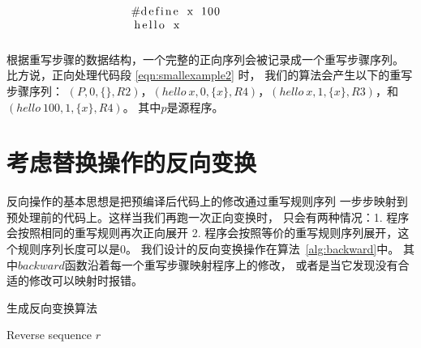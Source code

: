 \begin{equation}
\begin{minipage}{0.4\columnwidth}
\begin{lstlisting}
#define x 100
hello x
\end{lstlisting}
\end{minipage}
\label{eqn:smallexample2}
\end{equation}

根据重写步骤的数据结构，一个完整的正向序列会被记录成一个重写步骤序列。
比方说，正向处理代码段 \ref{eqn:smallexample2} 时，
我们的算法会产生以下的重写步骤序列：
$(P, 0, \{\}, R2)$，$(hello\ x, 0, \{x\}, R4)$，$(hello\ x, 1, \{x\}, R3)$，和
$(hello\ 100, 1, \{x\}, R4)$。
其中$p$是源程序。





\section{考虑替换操作的反向变换}\label{sec:backward}
反向操作的基本思想是把预编译后代码上的修改通过重写规则序列
一步步映射到预处理前的代码上。这样当我们再跑一次正向变换时，
只会有两种情况：1. 程序会按照相同的重写规则再次正向展开
2. 程序会按照等价的重写规则序列展开，这个规则序列长度可以是0。
我们设计的反向变换操作在算法~\ref{alg:backward}中。
其中$backward$函数沿着每一个重写步骤映射程序上的修改，
或者是当它发现没有合适的修改可以映射时报错。

\begin{algorithm}
  \newcommand\mycommfont[1]{\rmfamily{#1}}
  \caption{生成反向变换算法 \label{alg:backward}}
  Reverse sequence $r$\;
  \;
\end{algorithm}

